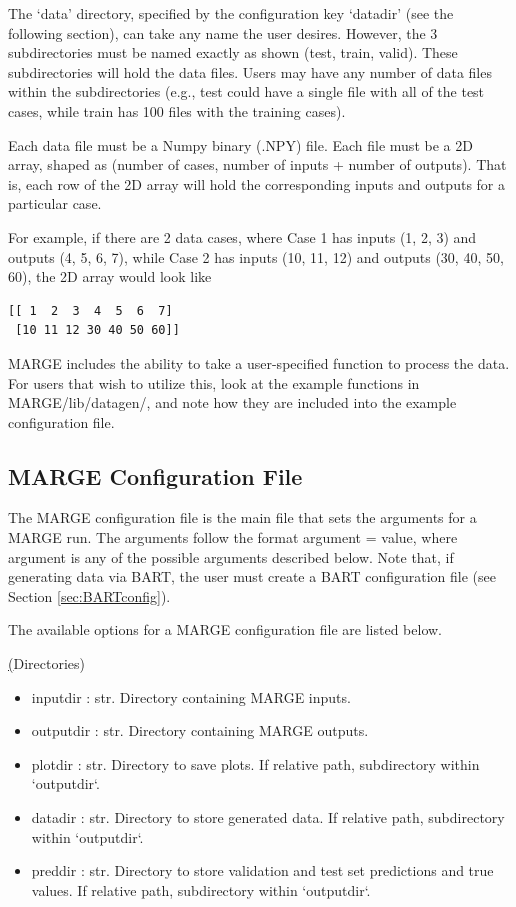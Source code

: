 \documentclass[letterpaper, 12pt]{article}
\begin{document}
\noindent The `data' directory, specified by the configuration key `datadir'
(see the following section), can take any name the user desires.  However, 
the 3 subdirectories must be named exactly as shown (test, train, 
valid).  These subdirectories will hold the data files. Users may have any 
number of data files within the subdirectories (e.g., test could have a single 
file with all of the test cases, while train has 100 files with the training 
cases). \newline

\noindent Each data file must be a Numpy binary (.NPY) file.  Each file must 
be a 2D array, shaped as (number of cases, number of inputs + number of 
outputs).  That is, each row of the 2D array will hold the corresponding 
inputs and outputs for a particular case. \newline

\noindent For example, if there are 2 data cases, 
where Case 1 has inputs (1, 2, 3) and outputs (4, 5, 6, 7), while Case 2 has 
inputs (10, 11, 12) and outputs (30, 40, 50, 60), the 2D array would look like 
\begin{verbatim}
[[ 1  2  3  4  5  6  7]
 [10 11 12 30 40 50 60]]
\end{verbatim}

\noindent MARGE includes the ability to take a user-specified function to 
process the data.  For users that wish to utilize this, look at the example 
functions in MARGE/lib/datagen/, and note how they are included into the 
example configuration file.


\subsection{MARGE Configuration File}
\label{sec:config}
The MARGE configuration file is the main file that sets the arguments for a 
MARGE run. The arguments follow the format {\ttb argument = value}, where 
{\ttb argument} is any of the possible arguments described below. Note that, 
if generating data via BART, the user must create a BART configuration file 
(see Section \ref{sec:BARTconfig}).

\noindent The available options for a MARGE configuration file are listed below.

\noindent \underline(Directories)
\begin{itemize}
\item inputdir   : str.  Directory containing MARGE inputs.
\item outputdir  : str.  Directory containing MARGE outputs.
\item plotdir    : str.  Directory to save plots. 
                         If relative path, subdirectory within `outputdir`.
\item datadir    : str.  Directory to store generated data. 
                         If relative path, subdirectory within `outputdir`.
\item preddir    : str.  Directory to store validation and test set predictions and true values. 
                         If relative path, subdirectory within `outputdir`.
\end{itemize}
\end{document}
